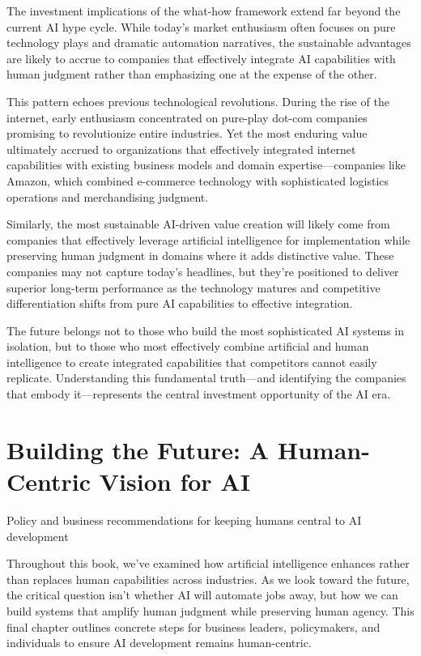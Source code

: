 \documentclass[
  Letterpaper,
]{scrbook}
\begin{document}
The investment implications of the what-how framework extend far beyond
the current AI hype cycle. While today's market enthusiasm often focuses
on pure technology plays and dramatic automation narratives, the
sustainable advantages are likely to accrue to companies that
effectively integrate AI capabilities with human judgment rather than
emphasizing one at the expense of the other.

This pattern echoes previous technological revolutions. During the rise
of the internet, early enthusiasm concentrated on pure-play dot-com
companies promising to revolutionize entire industries. Yet the most
enduring value ultimately accrued to organizations that effectively
integrated internet capabilities with existing business models and
domain expertise---companies like Amazon, which combined e-commerce
technology with sophisticated logistics operations and merchandising
judgment.

Similarly, the most sustainable AI-driven value creation will likely
come from companies that effectively leverage artificial intelligence
for implementation while preserving human judgment in domains where it
adds distinctive value. These companies may not capture today's
headlines, but they're positioned to deliver superior long-term
performance as the technology matures and competitive differentiation
shifts from pure AI capabilities to effective integration.

The future belongs not to those who build the most sophisticated AI
systems in isolation, but to those who most effectively combine
artificial and human intelligence to create integrated capabilities that
competitors cannot easily replicate. Understanding this fundamental
truth---and identifying the companies that embody it---represents the
central investment opportunity of the AI era.


\chapter{Building the Future: A Human-Centric Vision for
AI}\label{building-the-future-a-human-centric-vision-for-ai}

Policy and business recommendations for keeping humans central to AI
development

\hfill\break

Throughout this book, we've examined how artificial intelligence
enhances rather than replaces human capabilities across industries. As
we look toward the future, the critical question isn't whether AI will
automate jobs away, but how we can build systems that amplify human
judgment while preserving human agency. This final chapter outlines
concrete steps for business leaders, policymakers, and individuals to
ensure AI development remains human-centric.
\end{document}
